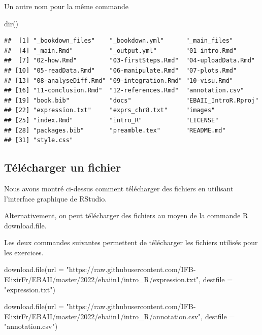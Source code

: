 \documentclass[
]{book}
\newenvironment{Shaded}{\begin{snugshade}}{\end{snugshade}}
\newcommand{\AttributeTok}[1]{\textcolor[rgb]{0.77,0.63,0.00}{#1}}
\newcommand{\FunctionTok}[1]{\textcolor[rgb]{0.00,0.00,0.00}{#1}}
\newcommand{\NormalTok}[1]{#1}
\newcommand{\StringTok}[1]{\textcolor[rgb]{0.31,0.60,0.02}{#1}}
\begin{document}
Un autre nom pour la même commande

\begin{Shaded}
\begin{Highlighting}[]
\FunctionTok{dir}\NormalTok{()}
\end{Highlighting}
\end{Shaded}

\begin{verbatim}
##  [1] "_bookdown_files"    "_bookdown.yml"      "_main_files"       
##  [4] "_main.Rmd"          "_output.yml"        "01-intro.Rmd"      
##  [7] "02-how.Rmd"         "03-firstSteps.Rmd"  "04-uploadData.Rmd" 
## [10] "05-readData.Rmd"    "06-manipulate.Rmd"  "07-plots.Rmd"      
## [13] "08-analyseDiff.Rmd" "09-integration.Rmd" "10-visu.Rmd"       
## [16] "11-conclusion.Rmd"  "12-references.Rmd"  "annotation.csv"    
## [19] "book.bib"           "docs"               "EBAII_IntroR.Rproj"
## [22] "expression.txt"     "exprs_chr8.txt"     "images"            
## [25] "index.Rmd"          "intro_R"            "LICENSE"           
## [28] "packages.bib"       "preamble.tex"       "README.md"         
## [31] "style.css"
\end{verbatim}

\hypertarget{tuxe9luxe9charger-un-fichier}{%
\subsection{Télécharger un fichier}\label{tuxe9luxe9charger-un-fichier}}

Nous avons montré ci-dessus comment télécharger des fichiers en utilisant l'interface graphique de RStudio.

Alternativement, on peut télécharger des fichiers au moyen de la commande R download.file.

Les deux commandes suivantes permettent de télécharger les fichiers utilisés pour les exercices.

\begin{Shaded}
\begin{Highlighting}[]
\FunctionTok{download.file}\NormalTok{(}\AttributeTok{url =} \StringTok{"https://raw.githubusercontent.com/IFB{-}ElixirFr/EBAII/master/2022/ebaiin1/intro\_R/expression.txt"}\NormalTok{, }\AttributeTok{destfile =} \StringTok{"expression.txt"}\NormalTok{)}
\end{Highlighting}
\end{Shaded}

\begin{Shaded}
\begin{Highlighting}[]
\FunctionTok{download.file}\NormalTok{(}\AttributeTok{url =} \StringTok{"https://raw.githubusercontent.com/IFB{-}ElixirFr/EBAII/master/2022/ebaiin1/intro\_R/annotation.csv"}\NormalTok{, }\AttributeTok{destfile =} \StringTok{"annotation.csv"}\NormalTok{)}
\end{Highlighting}
\end{Shaded}
\end{document}
